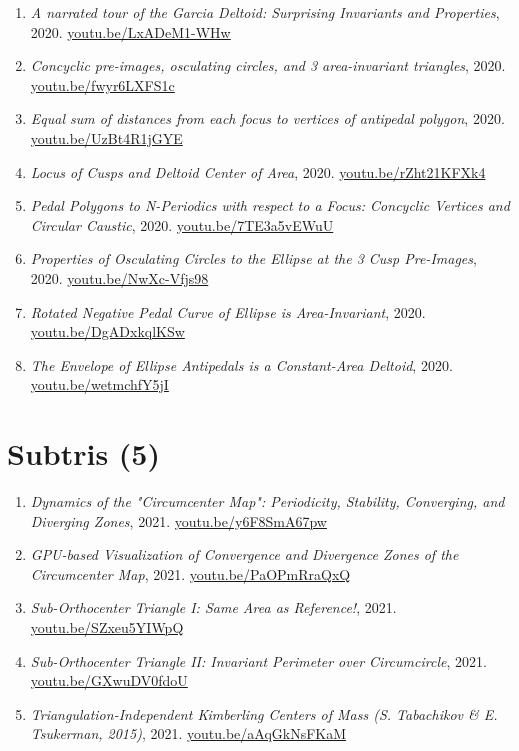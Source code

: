 \documentclass[12pt]{article}
\begin{document}
\begin{enumerate}[resume]
\item \textit{A narrated tour of the Garcia Deltoid: Surprising Invariants and Properties}, 2020. \href{https://youtu.be/LxADeM1-WHw}{\url{youtu.be/LxADeM1-WHw}}
\item \textit{Concyclic pre-images, osculating circles, and 3 area-invariant triangles}, 2020. \href{https://youtu.be/fwyr6LXFS1c}{\url{youtu.be/fwyr6LXFS1c}}
\item \textit{Equal sum of distances from each focus to vertices of antipedal polygon}, 2020. \href{https://youtu.be/UzBt4R1jGYE}{\url{youtu.be/UzBt4R1jGYE}}
\item \textit{Locus of Cusps and Deltoid Center of Area}, 2020. \href{https://youtu.be/rZht21KFXk4}{\url{youtu.be/rZht21KFXk4}}
\item \textit{Pedal Polygons to N-Periodics with respect to a Focus: Concyclic Vertices and Circular Caustic}, 2020. \href{https://youtu.be/7TE3a5vEWuU}{\url{youtu.be/7TE3a5vEWuU}}
\item \textit{Properties of Osculating Circles to the Ellipse at the 3 Cusp Pre-Images}, 2020. \href{https://youtu.be/NwXc-Vfjs98}{\url{youtu.be/NwXc-Vfjs98}}
\item \textit{Rotated Negative Pedal Curve of Ellipse is Area-Invariant}, 2020. \href{https://youtu.be/DgADxkqlKSw}{\url{youtu.be/DgADxkqlKSw}}
\item \textit{The Envelope of Ellipse Antipedals is a Constant-Area Deltoid}, 2020. \href{https://youtu.be/wetmchfY5jI}{\url{youtu.be/wetmchfY5jI}}
\end{enumerate}

\section{Subtris (5)}

\begin{enumerate}[resume]
\item \textit{Dynamics of the "Circumcenter Map": Periodicity, Stability, Converging, and Diverging Zones}, 2021. \href{https://youtu.be/y6F8SmA67pw}{\url{youtu.be/y6F8SmA67pw}}
\item \textit{GPU-based Visualization of Convergence and Divergence Zones of the Circumcenter Map}, 2021. \href{https://youtu.be/PaOPmRraQxQ}{\url{youtu.be/PaOPmRraQxQ}}
\item \textit{Sub-Orthocenter Triangle I: Same Area as Reference!}, 2021. \href{https://youtu.be/SZxeu5YIWpQ}{\url{youtu.be/SZxeu5YIWpQ}}
\item \textit{Sub-Orthocenter Triangle II: Invariant Perimeter over Circumcircle}, 2021. \href{https://youtu.be/GXwuDV0fdoU}{\url{youtu.be/GXwuDV0fdoU}}
\item \textit{Triangulation-Independent Kimberling Centers of Mass (S. Tabachikov \& E. Tsukerman, 2015)}, 2021. \href{https://youtu.be/aAqGkNsFKaM}{\url{youtu.be/aAqGkNsFKaM}}
\end{enumerate}
\end{document}
